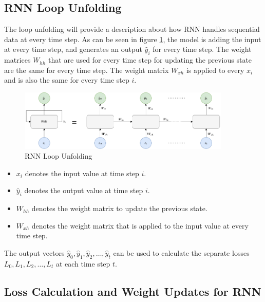         \subsection{RNN Loop Unfolding}
        \label{sec:rnn-loop-unfolding-background}

            The loop unfolding will provide a description about how RNN handles sequential data at every time step.
            As can be seen in figure \ref{fig:rnn-loop-unfolding}, the model is adding the input at every time step, and generates an output $\hat{y}_i$ for every time step.
            The weight matrices $W_{hh}$ that are used for every time step for updating the previous state are the same for every time step.
            The weight matrix $W_{xh}$ is applied to every $x_i$ and is also the same for every time step $i$.

            \begin{figure}[h!]
                \centering
                \includegraphics[width=0.90\textwidth]{figures/rnn_loop_unfolding.drawio.png}
                \caption{RNN Loop Unfolding}
                \label{fig:rnn-loop-unfolding}
            \end{figure}
            \begin{itemize}[label=\textemdash]
                \item $x_i$ denotes the input value at time step $i$.
                \item $\hat{y}_i$ denotes the output value at time step $i$.
                \item $W_{hh}$ denotes the weight matrix to update the previous state.
                \item $W_{xh}$ denotes the weight matrix that is applied to the input value at every time step.
            \end{itemize}
            The output vectors $\hat{y}_0, \hat{y}_1, \hat{y}_2, \dots, \hat{y}_t$ can be used to calculate the separate losses $L_0, L_1, L_2, \dots, L_t$ at each time step $t$.

        \subsection{Loss Calculation and Weight Updates for RNN}
        \label{sec:loss-calculation-and-weight-updates-for-rnn-background}
        
